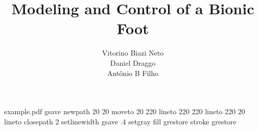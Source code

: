 %
%
%
%
%
\begin{filecontents*}{example.pdf}
	gsave
	newpath
	20 20 moveto
	20 220 lineto
	220 220 lineto
	220 20 lineto
	closepath
	2 setlinewidth
	gsave
	.4 setgray fill
	grestore
	stroke
	grestore
\end{filecontents*}
%
\RequirePackage{fix-cm}
%
\documentclass[smallextended]{svjour3}       %
%
\smartqed  %
%
\usepackage{graphicx}
%
%
%
%
%

	
	\title{Modeling and Control of a Bionic Foot%
	}
	
	
	\author{Vitorino Biazi Neto\\ Daniel Draggo\\ Ant\^onio B Filho %
	}
	
	
